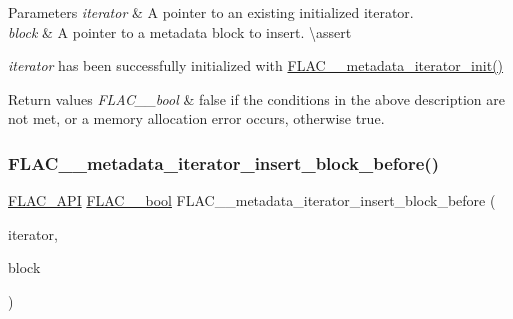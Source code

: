 \begin{DoxyParams}{Parameters}
{\em iterator} & A pointer to an existing initialized iterator. \\
\hline
{\em block} & A pointer to a metadata block to insert. \textbackslash{}assert 
\begin{DoxyCode}{1}
\end{DoxyCode}
 {\itshape iterator} has been successfully initialized with \mbox{\hyperlink{group__flac__metadata__level2_ga4a5af69a1f19436b02f738eb8c97c959}{F\+L\+A\+C\+\_\+\+\_\+metadata\+\_\+iterator\+\_\+init()}} \\
\hline
\end{DoxyParams}

\begin{DoxyRetVals}{Return values}
{\em F\+L\+A\+C\+\_\+\+\_\+bool} & {\ttfamily false} if the conditions in the above description are not met, or a memory allocation error occurs, otherwise {\ttfamily true}. \\
\hline
\end{DoxyRetVals}
\mbox{\label{group__flac__metadata__level2_ga163c1b4d8fdd72c0d6fb8816b2ae9b18}} 
\subsubsection{\texorpdfstring{FLAC\_\_metadata\_iterator\_insert\_block\_before()}{FLAC\_\_metadata\_iterator\_insert\_block\_before()}}
{\footnotesize\ttfamily \mbox{\hyperlink{group__flac__export_ga56ca07df8a23310707732b1c0007d6f5}{F\+L\+A\+C\+\_\+\+A\+PI}} \mbox{\hyperlink{ordinals_8h_a95103469f1cbd78b8cf250194985b34e}{F\+L\+A\+C\+\_\+\+\_\+bool}} F\+L\+A\+C\+\_\+\+\_\+metadata\+\_\+iterator\+\_\+insert\+\_\+block\+\_\+before (\begin{DoxyParamCaption}\item[{\mbox{\hyperlink{group__flac__metadata__level2_ga9f3e135a07cdef7e51597646aa7b89b2}{F\+L\+A\+C\+\_\+\+\_\+\+Metadata\+\_\+\+Iterator}} $\ast$}]{iterator,  }\item[{\mbox{\hyperlink{struct_f_l_a_c_____stream_metadata}{F\+L\+A\+C\+\_\+\+\_\+\+Stream\+Metadata}} $\ast$}]{block }\end{DoxyParamCaption})}

